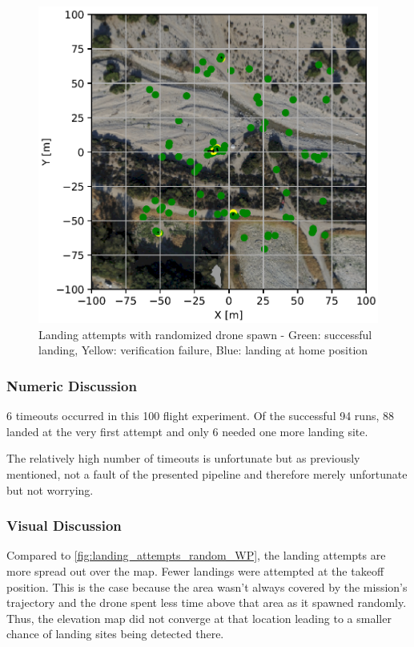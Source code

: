    \begin{figure}[h]
        \begin{center}
            \includegraphics[scale=0.25]{images/evaluation/landings_complete_randomized_GT.png}
            \caption{Landing attempts with randomized drone spawn - Green: successful landing, Yellow: verification failure, Blue: landing at home position}
            \label{fig:landing_attempts_complete_rand}
        \end{center}
    \end{figure}

    \subsubsection{Numeric Discussion}
    6 timeouts occurred in this 100 flight experiment. Of the successful 94 runs, 88 landed at the very first attempt and only 6 needed one more landing site.

    The relatively high number of timeouts is unfortunate but as previously mentioned, not a fault of the presented pipeline and therefore merely unfortunate but not worrying.


    \subsubsection{Visual Discussion}
    Compared to \cref{fig:landing_attempts_random_WP}, the landing attempts are more spread out over the map. Fewer landings were attempted at the takeoff position. This is the case because the area wasn't always covered by the mission's trajectory and the drone spent less time above that area as it spawned randomly. Thus, the elevation map did not converge at that location leading to a smaller chance of landing sites being detected there. 
    
